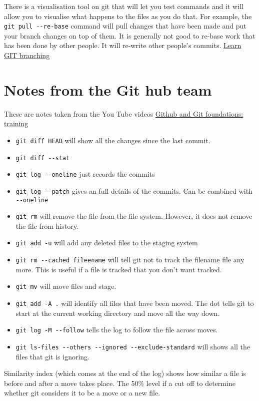 \documentclass[11pt]{article} %
\begin{document}
There is a visualisation tool on git that will let you test commands and it will allow you to visualise what happens to the files as you do that.   For example, the \lstinline{git pull --re-base} command will pull changes that have been made and put your branch changes on top of them. It is generally not good to re-base work that has been done by other people.  It will re-write other people's commits. \href{http://pcottle.github.io/learnGitBranching/}{Learn GIT branching}

\section{Notes from the Git hub team}
These are notes taken from the You Tube videos \href{https://www.youtube.com/watch?v=WxMFZncm12s&index=4&list=PLg7s6cbtAD15G8lNyoaYDuKZSKyJrgwB-}{Github and Git foundations: training}
\begin{itemize}
\item \lstinline{git diff HEAD} will show all the changes since the last commit. 
\item \lstinline{git diff --stat} 
\item \lstinline{git log --oneline} just records the commits
\item \lstinline{git log --patch} gives an full details of the commits. Can be combined with \lstinline{--oneline}
\item \lstinline{git rm} will remove the file from the file system.  However, it does not remove the file from history. 
\item \lstinline{git add -u} will add any deleted files to the staging system
\item \lstinline{git rm --cached fileename} will tell git not to track the filename file any more.  This is useful if a file is tracked that you don't want tracked.  
\item \lstinline{git mv} will move files and stage.
\item  \lstinline{git add -A .} will identify all files that have been moved.  The dot tells git to start at the current working directory and move all the way down.
\item \lstinline{git log -M --follow} tells the log to follow the file across moves. 
\item \lstinline{git ls-files --others --ignored --exclude-standard} will shows all the files that git is ignoring. 
\end{itemize}
Similarity index (which comes at the end of the log) shows how similar a file is before and after a move takes place. The 50\% level if a cut off to determine whether git considers it to be a move or a new file. 
\end{document}
